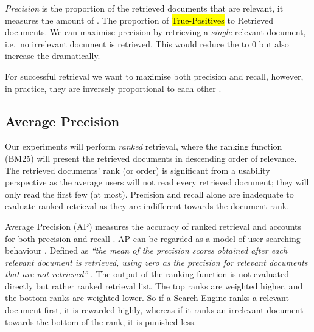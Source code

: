 \textit{Precision} is the proportion of the retrieved documents that are relevant, it measures the amount of . The proportion of \hl{True-Positives} to Retrieved documents. We can maximise precision by retrieving a \textit{single} relevant document, i.e.\ no irrelevant document is retrieved. This would reduce the  to 0 but also increase the  dramatically.

For successful retrieval we want to maximise both precision and recall, however, in practice, they are inversely proportional to each other \cite{shafi2005precision}.







\newpage
\subsection{Average Precision}

Our experiments will perform \textit{ranked} retrieval, where the ranking function (BM25) will present the retrieved documents in descending order of relevance. The retrieved documents' rank (or order) is significant from a usability perspective as the average users will not read every retrieved document; they will only read the first few (at most). Precision and recall alone are inadequate to evaluate ranked retrieval as they are indifferent towards the document rank.

Average Precision (AP) measures the accuracy of ranked retrieval and accounts for both precision and recall \cite{su2015relationship}. AP can be regarded as a model of user searching behaviour \cite{robertson2008new}. Defined as\textit{ ``the mean of the precision scores obtained after each relevant document is retrieved, using zero as the precision for relevant documents that are not retrieved''} \cite{buckley2017evaluating}. The output of the ranking function is not evaluated directly but rather ranked retrieval list. The top ranks are weighted higher, and the bottom ranks are weighted lower. So if a Search Engine ranks a relevant document first, it is rewarded highly, whereas if it ranks an irrelevant document towards the bottom of the rank, it is punished less. 



